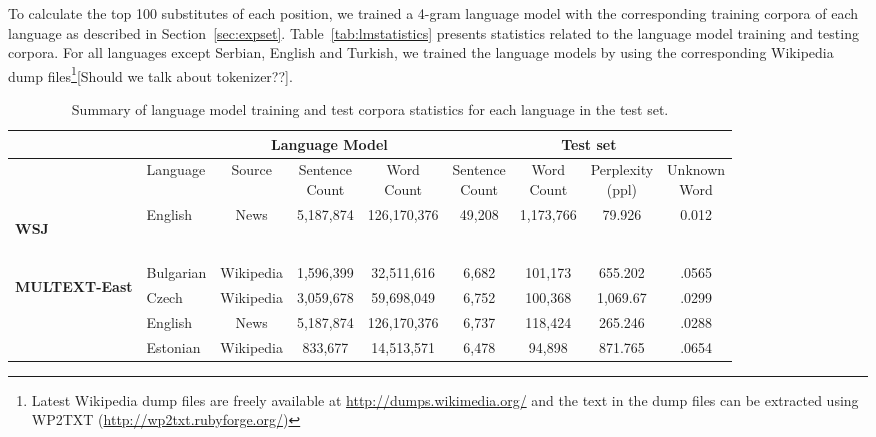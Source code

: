 To calculate the top 100 substitutes of each position, we trained a 4-gram
language model with the corresponding training corpora of each
language as described in Section~\ref{sec:expset}.
Table~\ref{tab:lmstatistics} presents statistics related to the
language model training and testing corpora.  For all languages except
Serbian, English and Turkish, we trained the language models by using
the corresponding Wikipedia dump files\footnote{Latest Wikipedia dump
  files are freely available at \url{http://dumps.wikimedia.org/} and
  the text in the dump files can be extracted using WP2TXT
  (\url{http://wp2txt.rubyforge.org/})}[Should we talk about
  tokenizer??].
\begin{table}[ht]
  \caption{Summary of language model training and test corpora
  statistics for each language in the test set.} 
  \begin{tabular}{@{ }l@{ }|@{ }l@{ }|@{ }c@{ }|@{ }c@{ }|@{ }c@{ }|c@{ }|@{ }c@{ }|@{ }c@{ }|@{ }c@{ }|}
  \hline
    & & \multicolumn{3}{c|}{Language Model} & \multicolumn{4}{c|}{Test set}\\    \hline
    & Language & Source & \specialcell{Sentence\\Count} & \specialcell{Word\\Count} & \specialcell{Sentence\\Count} & \specialcell{Word\\Count} & \specialcell{Perplexity\\(ppl)} & \specialcell{Unknown\\Word} \\ \cline{1-9}
    \multirow{1}{*}{\begin{sideways}\textbf{WSJ}\end{sideways}} 
    &English & News & 5,187,874 & 126,170,376 & 49,208 & 1,173,766 & 79.926 & 0.012\\
    & & & & && & &\\\hline
    \multirow{8}{*}{\begin{sideways}\textbf{MULTEXT-East}\end{sideways}}
    &Bulgarian& Wikipedia &1,596,399 & 32,511,616  & 6,682 & 101,173 & 655.202 & .0565\\
    &Czech & Wikipedia &3,059,678 & 59,698,049 & 6,752 & 100,368 & 1,069.67 & .0299\\
    &English & News & 5,187,874 & 126,170,376 & 6,737 & 118,424 & 265.246 & .0288\\
    &Estonian & Wikipedia &833,677 & 14,513,571 & 6,478 & 94,898 & 871.765 & .0654\\

\end{tabular}
\end{table}

